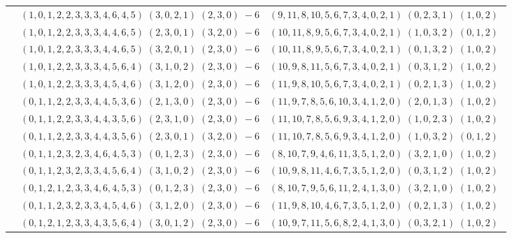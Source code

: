 \documentclass[11pt]{article}
\begin{document}
\begin{longtable}[l]{|c|c|c|}
 \cline{2-3} 
 & $(1 ,0 ,1 ,2 ,2 ,3 ,3 ,3 ,4 ,6 ,4 ,5) \;(3 ,0 ,2 ,1) \;(2 ,3 ,0) \;-6$ & $(9 ,11 ,8 ,10 ,5 ,6 ,7 ,3 ,4 ,0 ,2 ,1) \;(0 ,2 ,3 ,1) \;(1 ,0 ,2) \;$\\ 
 \cline{2-3} 
 & $(1 ,0 ,1 ,2 ,2 ,3 ,3 ,3 ,4 ,4 ,6 ,5) \;(2 ,3 ,0 ,1) \;(3 ,2 ,0) \;-6$ & $(10 ,11 ,8 ,9 ,5 ,6 ,7 ,3 ,4 ,0 ,2 ,1) \;(1 ,0 ,3 ,2) \;(0 ,1 ,2) \;$\\ 
 \cline{2-3} 
 & $(1 ,0 ,1 ,2 ,2 ,3 ,3 ,3 ,4 ,4 ,6 ,5) \;(3 ,2 ,0 ,1) \;(2 ,3 ,0) \;-6$ & $(10 ,11 ,8 ,9 ,5 ,6 ,7 ,3 ,4 ,0 ,2 ,1) \;(0 ,1 ,3 ,2) \;(1 ,0 ,2) \;$\\ 
 \cline{2-3} 
 & $(1 ,0 ,1 ,2 ,2 ,3 ,3 ,3 ,4 ,5 ,6 ,4) \;(3 ,1 ,0 ,2) \;(2 ,3 ,0) \;-6$ & $(10 ,9 ,8 ,11 ,5 ,6 ,7 ,3 ,4 ,0 ,2 ,1) \;(0 ,3 ,1 ,2) \;(1 ,0 ,2) \;$\\ 
 \cline{2-3} 
 & $(1 ,0 ,1 ,2 ,2 ,3 ,3 ,3 ,4 ,5 ,4 ,6) \;(3 ,1 ,2 ,0) \;(2 ,3 ,0) \;-6$ & $(11 ,9 ,8 ,10 ,5 ,6 ,7 ,3 ,4 ,0 ,2 ,1) \;(0 ,2 ,1 ,3) \;(1 ,0 ,2) \;$\\ 
 \cline{2-3} 
 & $(0 ,1 ,1 ,2 ,2 ,3 ,3 ,4 ,4 ,5 ,3 ,6) \;(2 ,1 ,3 ,0) \;(2 ,3 ,0) \;-6$ & $(11 ,9 ,7 ,8 ,5 ,6 ,10 ,3 ,4 ,1 ,2 ,0) \;(2 ,0 ,1 ,3) \;(1 ,0 ,2) \;$\\ 
 \cline{2-3} 
 & $(0 ,1 ,1 ,2 ,2 ,3 ,3 ,4 ,4 ,3 ,5 ,6) \;(2 ,3 ,1 ,0) \;(2 ,3 ,0) \;-6$ & $(11 ,10 ,7 ,8 ,5 ,6 ,9 ,3 ,4 ,1 ,2 ,0) \;(1 ,0 ,2 ,3) \;(1 ,0 ,2) \;$\\ 
 \cline{2-3} 
 & $(0 ,1 ,1 ,2 ,2 ,3 ,3 ,4 ,4 ,3 ,5 ,6) \;(2 ,3 ,0 ,1) \;(3 ,2 ,0) \;-6$ & $(11 ,10 ,7 ,8 ,5 ,6 ,9 ,3 ,4 ,1 ,2 ,0) \;(1 ,0 ,3 ,2) \;(0 ,1 ,2) \;$\\ 
 \cline{2-3} 
 & $(0 ,1 ,1 ,2 ,3 ,2 ,3 ,4 ,6 ,4 ,5 ,3) \;(0 ,1 ,2 ,3) \;(2 ,3 ,0) \;-6$ & $(8 ,10 ,7 ,9 ,4 ,6 ,11 ,3 ,5 ,1 ,2 ,0) \;(3 ,2 ,1 ,0) \;(1 ,0 ,2) \;$\\ 
 \cline{2-3} 
 & $(0 ,1 ,1 ,2 ,3 ,2 ,3 ,3 ,4 ,5 ,6 ,4) \;(3 ,1 ,0 ,2) \;(2 ,3 ,0) \;-6$ & $(10 ,9 ,8 ,11 ,4 ,6 ,7 ,3 ,5 ,1 ,2 ,0) \;(0 ,3 ,1 ,2) \;(1 ,0 ,2) \;$\\ 
 \cline{2-3} 
 & $(0 ,1 ,2 ,1 ,2 ,3 ,3 ,4 ,6 ,4 ,5 ,3) \;(0 ,1 ,2 ,3) \;(2 ,3 ,0) \;-6$ & $(8 ,10 ,7 ,9 ,5 ,6 ,11 ,2 ,4 ,1 ,3 ,0) \;(3 ,2 ,1 ,0) \;(1 ,0 ,2) \;$\\ 
 \cline{2-3} 
 & $(0 ,1 ,1 ,2 ,3 ,2 ,3 ,3 ,4 ,5 ,4 ,6) \;(3 ,1 ,2 ,0) \;(2 ,3 ,0) \;-6$ & $(11 ,9 ,8 ,10 ,4 ,6 ,7 ,3 ,5 ,1 ,2 ,0) \;(0 ,2 ,1 ,3) \;(1 ,0 ,2) \;$\\ 
 \cline{2-3} 
 & $(0 ,1 ,2 ,1 ,2 ,3 ,3 ,4 ,3 ,5 ,6 ,4) \;(3 ,0 ,1 ,2) \;(2 ,3 ,0) \;-6$ & $(10 ,9 ,7 ,11 ,5 ,6 ,8 ,2 ,4 ,1 ,3 ,0) \;(0 ,3 ,2 ,1) \;(1 ,0 ,2) \;$\\ 

\end{longtable}
\end{document}

